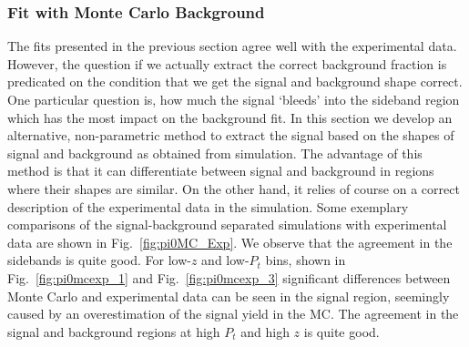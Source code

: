 \subsubsection{Fit with Monte Carlo Background}
\label{sec:fit_with_MC_BG}

The fits presented in the previous section agree well with the experimental data. 
However, the question if we actually extract the correct background fraction is predicated on the condition that we get the signal and background shape correct.  One particular question is, how much the signal `bleeds' into the sideband region which has the most impact on the background fit. In this section we  develop an alternative, non-parametric method to extract the signal based on the shapes of signal and background as obtained from simulation. The advantage of this method is that it can differentiate between signal and background in regions where their shapes are similar. On the other hand, it relies of course on a correct description of the experimental data in the simulation.
Some exemplary comparisons of the signal-background separated simulations with experimental data are shown in  Fig.~\ref{fig:pi0MC_Exp}. We observe that the agreement in the sidebands is quite good.  For low-$z$ and low-$P_t$ bins,  shown in Fig.~\ref{fig:pi0mcexp_1} and Fig.~\ref{fig:pi0mcexp_3} significant differences between Monte Carlo and experimental data can be seen in the signal region, seemingly caused by an overestimation of the signal yield in the MC. The agreement in the signal and background regions at high $P_t$ and high $z$ is quite good. 
